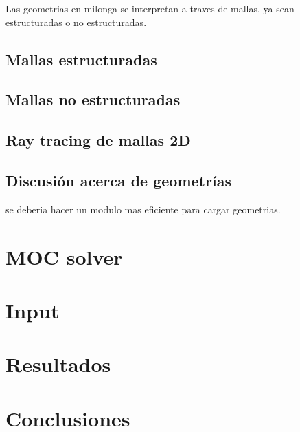 \documentclass[11pt]{article}
\begin{document}
Las geometrias en milonga se interpretan a traves de mallas, ya sean estructuradas o no estructuradas. 

\subsection{Mallas estructuradas}

\subsection{Mallas no estructuradas}

\subsection{Ray tracing de mallas 2D}

\subsection{Discusi\'on acerca de geometr\'ias}

se deberia hacer un modulo mas eficiente para cargar geometrias.

\section{MOC solver}

\section{Input}

\section{Resultados}

\section{Conclusiones}

\label{lastpage}

\printbibliography
\end{document}
